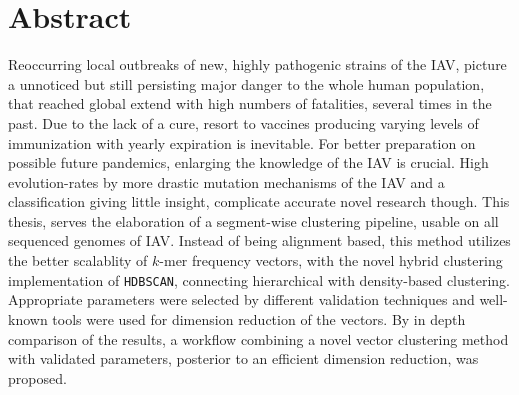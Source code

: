 \chapter*{Abstract}

Reoccurring local outbreaks of new, highly pathogenic strains of the \gls{IAV}, picture a unnoticed but still persisting major danger to the whole human population, that reached global extend with high numbers of fatalities, several times in the past. Due to the lack of a cure, resort to vaccines producing varying levels of immunization with yearly expiration is inevitable. For better preparation on possible future pandemics, enlarging the knowledge of the \gls{IAV} is crucial. High evolution-rates by more drastic mutation mechanisms of the \gls{IAV} and a classification giving little insight, complicate accurate novel research though. This thesis, serves the elaboration of a segment-wise clustering pipeline, usable on all sequenced genomes of \gls{IAV}. Instead of being alignment based, this method utilizes the better scalablity of $k$-mer frequency vectors, with the novel hybrid clustering implementation of \texttt{HDBSCAN}, connecting hierarchical with density-based clustering. Appropriate parameters were selected by different validation techniques and well-known tools were used for dimension reduction of the vectors. By in depth comparison of the results, a workflow combining a novel vector clustering method with validated parameters, posterior to an efficient dimension reduction, was proposed. 